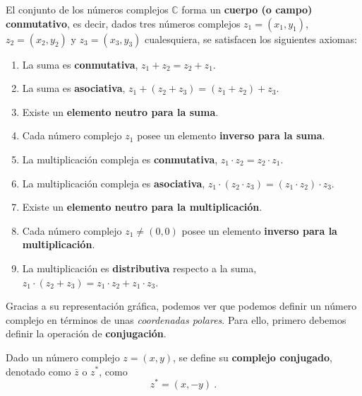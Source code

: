 \begin{teorema}
    El conjunto de los números complejos $\mathbb{C}$ forma un \textbf{cuerpo (o campo) conmutativo}, es decir, dados tres números complejos $z_1 = (x_1, y_1)$, $z_2 = (x_2, y_2)$ y $z_3 = (x_3, y_3)$ cualesquiera, se satisfacen los siguientes axiomas:
    \begin{enumerate}
        \item La suma es \textbf{conmutativa}, $z_1 + z_2 = z_2 + z_1$.
        \item La suma es \textbf{asociativa}, $z_1 + (z_2 + z_3) = (z_1 + z_2) + z_3$.
        \item Existe un \textbf{elemento neutro para la suma}.
        \item Cada número complejo $z_1$ posee un elemento \textbf{inverso para la suma}.
        \item La multiplicación compleja es \textbf{conmutativa}, $z_1 \cdot z_2 = z_2 \cdot z_1$.
        \item La multiplicación compleja es \textbf{asociativa}, $z_1 \cdot (z_2 \cdot z_3) = (z_1 \cdot z_2) \cdot z_3$.
        \item Existe un \textbf{elemento neutro para la multiplicación}.
        \item Cada número complejo $z_1 \neq (0,0)$ posee un elemento \textbf{inverso para la multiplicación}.
        \item La multiplicación es \textbf{distributiva} respecto a la suma, $z_1 \cdot (z_2 + z_3) = z_1 \cdot z_2 + z_1 \cdot z_3$.
    \end{enumerate}
\end{teorema}


Gracias a su representación gráfica, podemos ver que podemos definir un número complejo en términos de unas \emph{coordenadas polares}. Para ello, primero debemos definir la operación de \textbf{conjugación}.

\begin{defi}
    Dado un número complejo $z = (x,y)$, se define su \textbf{complejo conjugado}, denotado como $\bar{z}$ o $z^\ast$, como
    \begin{equation}
        z^\ast = (x, -y) \ .
    \end{equation}
\end{defi}


